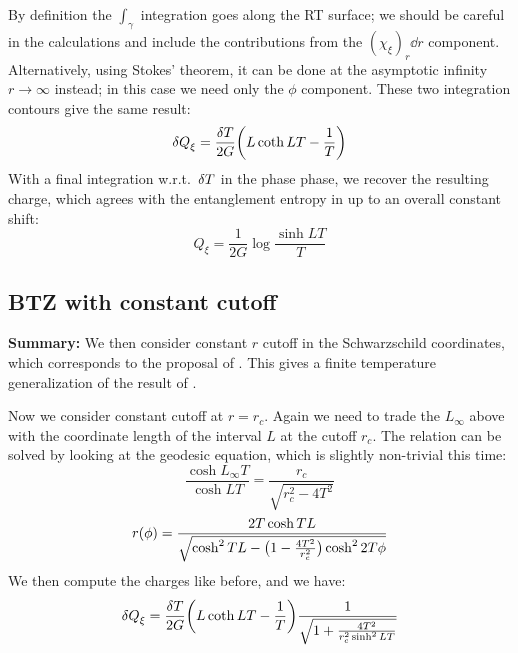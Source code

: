 \documentclass[11pt,a4paper]{article}
\begin{document}
	By definition the $\int_\gamma$ integration goes along the RT surface; we should be careful in the calculations and include the contributions from the $(\chi_\xi)_r \dd{r}$ component. 
	Alternatively, using Stokes' theorem, it can be done at the asymptotic infinity $r\to\infty$ instead; in this case we need only the $\phi$ component. These two integration contours give the same result:
	\begin{equation}
		\var{Q}_\xi
		= \frac{\var{T}}{2G} \pqty{
				L \coth LT - \frac{1}{T}
			}
	\end{equation}
	With a final integration w.r.t.~$\var{T}$ in the phase phase, we recover the resulting charge, which agrees with the entanglement entropy in \cite{Rangamani:2016dms} up to an overall constant shift:
	\begin{equation}
		Q_\xi = \frac{1}{2G} \log \frac{\sinh LT}{T}
	\end{equation}
	
\pagebreak
\subsection{BTZ with constant cutoff}
\textbf{Summary:} We then consider constant $r$ cutoff in the Schwarzschild coordinates, which corresponds to the proposal of \cite{McGough:2016lol}. This gives a finite temperature generalization of the result of \cite{Lewkowycz:2019xse}. 

	Now we consider constant cutoff at $r = r_c$. Again we need to trade the $L_\infty$ above with the coordinate length of the interval $L$ at the cutoff $r_c$. The relation can be solved by looking at the geodesic equation, which is slightly non-trivial this time:
	\begin{equation}
		\frac{\cosh L_\infty T}{\cosh LT}
		= \frac{r_c}{\sqrt{r_c^2 - 4T^2}}
	\end{equation}
	\begin{equation}
		r(\phi) = \frac{2T\cosh TL}{
				\sqrt{\cosh^2 TL - \pqty\big{
					1 - \frac{4T^2}{r_c^2}
				}\cosh^2 2T\phi}
			}
	\end{equation}
	We then compute the charges like before, and we have:
	\begin{equation}
		\var{Q}_\xi
		= \frac{\var{T}}{2G} \pqty{
				L \coth LT - \frac{1}{T}
			}
			\frac{1}{\sqrt{
				1 + \frac{4T^2}{r_c^2 \sinh^2 LT}
			}}
	\end{equation}
	
\end{document}
